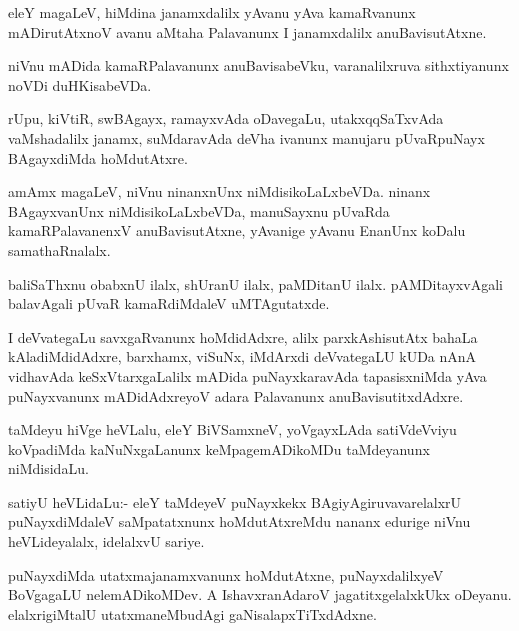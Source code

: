 \documentclass{article}
\begin{document}
\begin{mn}
eleY magaLeV, hiMdina janamxdalilx yAvanu yAva kamaRvanunx
mADirutAtxnoV avanu aMtaha Palavanunx I janamxdalilx anuBavisutAtxne. 
\end{mn}

\begin{mn}
niVnu mADida kamaRPalavanunx anuBavisabeVku, varanalilxruva
sithxtiyanunx noVDi duHKisabeVDa.
\end{mn}

\begin{mn}
rUpu, kiVtiR, swBAgayx, ramayxvAda oDavegaLu, utakxqqSaTxvAda
vaMshadalilx janamx, suMdaravAda deVha ivanunx manujaru pUvaRpuNayx
BAgayxdiMda hoMdutAtxre.
\end{mn}

\begin{mn}%
amAmx magaLeV, niVnu ninanxnUnx niMdisikoLaLxbeVDa. ninanx
BAgayxvanUnx niMdisikoLaLxbeVDa, manuSayxnu pUvaRda kamaRPalavanenxV
anuBavisutAtxne, yAvanige yAvanu EnanUnx koDalu samathaRnalalx.
\end{mn}

\begin{mn}
baliSaThxnu obabxnU ilalx, shUranU ilalx, paMDitanU
ilalx. pAMDitayxvAgali balavAgali pUvaR kamaRdiMdaleV uMTAgutatxde.
\end{mn}

\begin{mn}%
I deVvategaLu savxgaRvanunx hoMdidAdxre, alilx parxkAshisutAtx bahaLa
kAladiMdidAdxre, barxhamx, viSuNx, iMdArxdi deVvategaLU kUDa nAnA
vidhavAda keSxVtarxgaLalilx mADida puNayxkaravAda tapasisxniMda yAva
puNayxvanunx mADidAdxreyoV adara Palavanunx anuBavisutitxdAdxre.
\end{mn}

\begin{mn}
taMdeyu hiVge heVLalu, eleY BiVSamxneV, yoVgayxLAda satiVdeVviyu
koVpadiMda kaNuNxgaLanunx keMpagemADikoMDu taMdeyanunx niMdisidaLu.
\end{mn}

\begin{mn}%
satiyU heVLidaLu:- eleY taMdeyeV puNayxkekx BAgiyAgiruvavarelalxrU
puNayxdiMdaleV saMpatatxnunx hoMdutAtxreMdu nananx edurige niVnu
heVLideyalalx, idelalxvU sariye.
\end{mn}

\begin{mn}
puNayxdiMda utatxmajanamxvanunx hoMdutAtxne, puNayxdalilxyeV BoVgagaLU
nelemADikoMDev. A IshavxranAdaroV jagatitxgelalxkUkx
oDeyanu. elalxrigiMtalU utatxmaneMbudAgi gaNisalapxTiTxdAdxne.
\end{mn}
\end{document}
